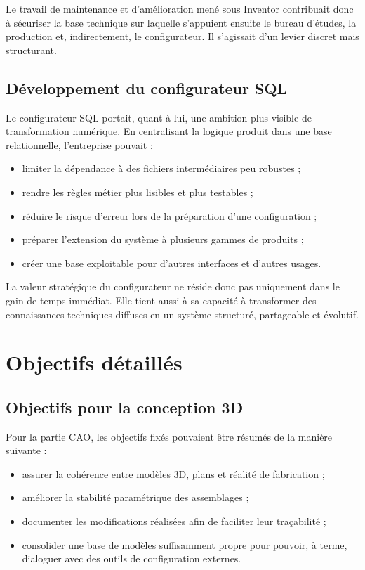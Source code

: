 Le travail de maintenance et d'amélioration mené sous Inventor contribuait donc à sécuriser la base technique sur laquelle s'appuient ensuite le bureau d'études, la production et, indirectement, le configurateur. Il s'agissait d'un levier discret mais structurant.

\subsection{Développement du configurateur SQL}

Le configurateur SQL portait, quant à lui, une ambition plus visible de transformation numérique. En centralisant la logique produit dans une base relationnelle, l'entreprise pouvait :

\begin{itemize}[leftmargin=1.4cm]
\item limiter la dépendance à des fichiers intermédiaires peu robustes ;
\item rendre les règles métier plus lisibles et plus testables ;
\item réduire le risque d'erreur lors de la préparation d'une configuration ;
\item préparer l'extension du système à plusieurs gammes de produits ;
\item créer une base exploitable pour d'autres interfaces et d'autres usages.
\end{itemize}

La valeur stratégique du configurateur ne réside donc pas uniquement dans le gain de temps immédiat. Elle tient aussi à sa capacité à transformer des connaissances techniques diffuses en un système structuré, partageable et évolutif.

\section{Objectifs détaillés}

\subsection{Objectifs pour la conception 3D}

Pour la partie CAO, les objectifs fixés pouvaient être résumés de la manière suivante :

\begin{itemize}[leftmargin=1.4cm]
\item assurer la cohérence entre modèles 3D, plans et réalité de fabrication ;
\item améliorer la stabilité paramétrique des assemblages ;
\item documenter les modifications réalisées afin de faciliter leur traçabilité ;
\item consolider une base de modèles suffisamment propre pour pouvoir, à terme, dialoguer avec des outils de configuration externes.
\end{itemize}

